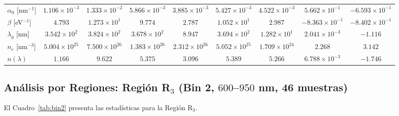 \documentclass{article}
\begin{document}
\begin{table}[htbp]
\begin{tabular}{@{}lcccccccc@{}}
$\alpha_{0}$ [nm$^{-1}$] & $1.106 \times 10^{-3}$ & $1.333 \times 10^{-2}$ & $5.866 \times 10^{-3}$ & $3.885 \times 10^{-3}$ & $5.427 \times 10^{-3}$ & $4.522 \times 10^{-3}$ & $5.662 \times 10^{-1}$ & $-6.593 \times 10^{-1}$ \\
$\beta$ [eV$^{-1}$] & $4.793$ & $1.273 \times 10^1$ & $9.774$ & $2.787$ & $1.052 \times 10^1$ & $2.987$ & $-8.363 \times 10^{-1}$ & $-8.402 \times 10^{-1}$ \\
$\lambda_{g}$ [nm] & $3.542 \times 10^2$ & $3.824 \times 10^2$ & $3.678 \times 10^2$ & $8.947$ & $3.694 \times 10^2$ & $1.282 \times 10^1$ & $2.041 \times 10^{-3}$ & $-1.116$ \\
$n_{e}$ [nm$^{-3}$] & $5.004 \times 10^{25}$ & $7.500 \times 10^{26}$ & $1.383 \times 10^{26}$ & $2.312 \times 10^{26}$ & $5.052 \times 10^{25}$ & $1.709 \times 10^{24}$ & $2.268$ & $3.142$ \\
$n(\lambda)$ & $1.166$ & $9.622$ & $5.375$ & $3.096$ & $5.389$ & $5.266$ & $6.788 \times 10^{-3}$ & $-1.746$ \\
\bottomrule
\end{tabular}
\end{table}

\subsection{An\'alisis por Regiones: Regi\'on R$_3$ (Bin 2, $600$--$950$ nm, 46 muestras)}

El Cuadro~\ref{tab:bin2} presenta las estad\'isticas para la Regi\'on R$_3$.
\end{document}
